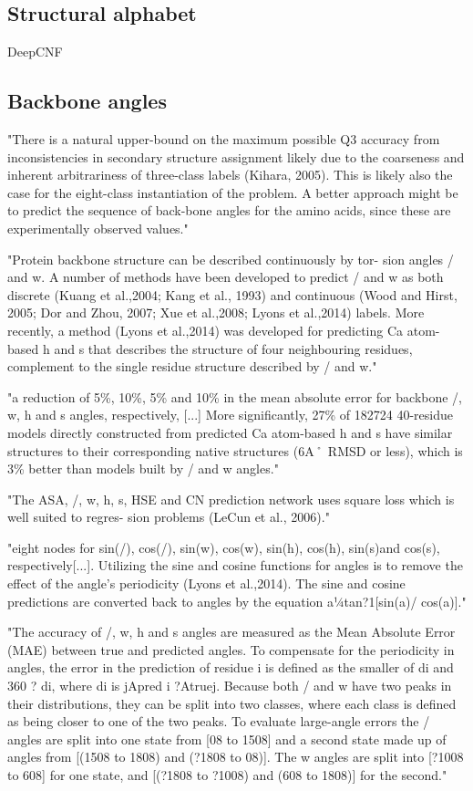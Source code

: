 \documentclass[]{scrartcl}
\begin{document}
\subsection{Structural alphabet}
DeepCNF \cite{Wang2016}

\subsection{Backbone angles}
"There is a natural upper-bound on the maximum possible Q3 accuracy from inconsistencies in secondary structure assignment likely due to the coarseness and inherent arbitrariness of three-class labels (Kihara, 2005). This is likely also the case for the eight-class instantiation of the problem. A better approach might be to predict the sequence of back-bone angles for the amino acids, since these are experimentally observed values." \cite{Busia2017}

"Protein backbone structure can be described continuously by tor-
sion angles / and w. A number of methods have been developed to predict / and w as both discrete (Kuang et al.,2004; Kang et al., 1993) and continuous (Wood and Hirst, 2005; Dor and Zhou, 2007; Xue et al.,2008; Lyons et al.,2014) labels. More recently, a method (Lyons et al.,2014) was developed for predicting Ca atom-based h and s that describes the structure of four neighbouring residues, complement to the single residue structure described by / and w." \cite{Heffernan2017}

"a reduction of 5\%, 10\%, 5\% and 10\% in the mean absolute error for backbone /, w, h and s angles, respectively, [...] More significantly, 27\% of 182724 40-residue models directly constructed from predicted Ca atom-based h and s have similar structures to their corresponding native structures (6A˚ RMSD or less), which is 3\% better than models built by / and w angles." \cite{Heffernan2017}

"The ASA, /, w, h, s, HSE and CN prediction network uses square loss which is well suited to regres- sion problems (LeCun et al., 2006)." \cite{Heffernan2017}

"eight nodes for sin(/), cos(/), sin(w), cos(w), sin(h), cos(h), sin(s)and cos(s), respectively[...]. Utilizing the sine and cosine functions for angles is to remove the effect of the angle’s periodicity (Lyons et al.,2014). The sine and cosine predictions are converted back to angles by the equation a¼tan?1[sin(a)/ cos(a)]." \cite{Heffernan2017}

"The accuracy of /, w, h and s angles are measured as the Mean Absolute Error (MAE) between true and predicted angles. To compensate for the periodicity in angles, the error in the prediction of residue i is defined as the smaller of di and 360 ? di, where di is jApred i ?Atruej. Because both / and w have two peaks in their distributions, they can be split into two classes, where each class is defined as being closer to one of the two peaks. To evaluate large-angle errors the / angles are split into one state from [08 to 1508] and a second state made up of angles from [(1508 to 1808) and (?1808 to 08)]. The w angles are split into [?1008 to 608] for one state, and [(?1808 to ?1008) and (608 to 1808)] for the second." \cite{Heffernan2017}

{}

\end{document}
